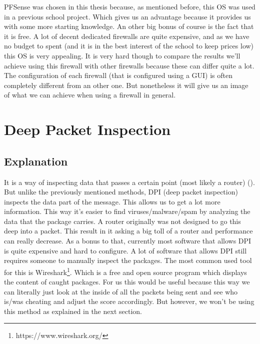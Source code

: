 PFSense was chosen in this thesis because, as mentioned before, this OS was used in a previous school project. Which gives us an advantage because it provides us with some more starting knowledge. An other big bonus of course is the fact that it is free. A lot of decent dedicated firewalls are quite expensive, and as we have no budget to spent (and it is in the best interest of the school to keep prices low) this OS is very appealing. It is very hard though to compare the results we'll achieve using this firewall with other firewalls because these can differ quite a lot. The configuration of each firewall (that is configured using a GUI) is often completely different from an other one. But nonetheless it will give us an image of what we can achieve when using a firewall in general.

\section{Deep Packet Inspection}
\subsection{Explanation}
It is a way of inspecting data that passes a certain point (most likely a router) (\textcite{SourceDpi}). But unlike the previously mentioned methods, DPI (deep packet inspection) inspects the data part of the message. This allows us to get a lot more information. This way it's easier to find viruses/malware/spam by analyzing the data that the package carries. A router originally was not designed to go this deep into a packet. This result in it asking a big toll of a router and performance can really decrease. As a bonus to that, currently most software that allows DPI is quite expensive and hard to configure. A lot of software that allows DPI still requires someone to manually inspect the packages. The most common used tool for this is Wireshark\footnote{https://www.wireshark.org/}. Which is a free and open source program which displays the content of caught packages.
For us this would be useful because this way we can literally just look at the inside of all the packets being sent and see who is/was cheating and adjust the score accordingly. But however, we won't be using this method as explained in the next section.
